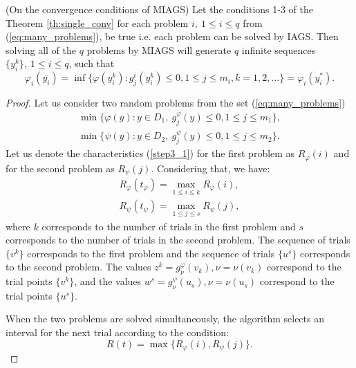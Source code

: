 \documentclass[runningheads]{llncs}
\begin{document}
\begin{theorem} (On the convergence conditions of MIAGS) Let the conditions 1-3 of the Theorem \ref{th:single_conv} for each problem \(i,\:1\leqslant i\leqslant q\) from (\ref{eq:many_problems}), be true
i.e. each problem can be solved by IAGS.
  Then solving all of the \(q\) problems by MIAGS will
  generate \(q\) infinite sequences \(\{y^k_i\},\:1\leqslant i\leqslant q\), such that
  \begin{displaymath}
    \varphi_i(\overline{y_i})=\inf\{ \varphi(y^k_i): g^i_j(y^k_i)\leqslant 0,1\leqslant j\leqslant m_i, k=1,2,\dots\}=\varphi_i(y^*_i).
  \end{displaymath}
\end{theorem}
\begin{proof}
  Let us consider two random problems from the set (\ref{eq:many_problems})
  \begin{equation}
      \begin{array}{lr}
        \min\{\varphi(y):y\in D_1,\: g_j^\varphi(y)\leqslant 0, 1\leqslant j\leqslant m_1\}, \\
        \min\{\psi(y):y\in D_2,\: g_j^\psi(y)\leqslant 0, 1\leqslant j\leqslant m_2\}.
      \end{array}
  \end{equation}
  Let us denote the characteristics (\ref{step3_1}) for the first problem as \(R_\varphi(i)\)
  and for the second problem as \(R_\psi(j)\). Considering that, we have:
  \begin{equation}
      \begin{array}{lr}
        R_\varphi(t_\varphi)=\max_{1\leqslant i\leqslant k}R_\varphi(i), \\
        R_\psi(t_\psi)=\max_{1\leqslant j\leqslant s}R_\psi(j),
      \end{array}
  \end{equation}
  where \(k\) corresponds to the number of trials in the first problem and \(s\)
  corresponds to the number of trials in the second problem. The sequence of trials \(\{v^k\}\)
  corresponds to the first problem and the sequence of trials \(\{u^s\}\)
  corresponds to the second problem. The values \(z^k=g^\varphi_\nu(v_k),\nu =\nu (v_{k})\) correspond to the
  trial points \(\{v^k\}\), and the values \(w^s=g^\psi_\nu(u_s),\nu =\nu(u_{s})\) correspond to the
  trial points \(\{u^s\}\).

  When the two problems are solved simultaneously, the algorithm selects
  an interval for the next trial according to the condition:
  \begin{equation}
    R(t) = \max\{R_\varphi(i),R_\psi(j)\}.
  \end{equation}


\end{proof}
\end{document}
